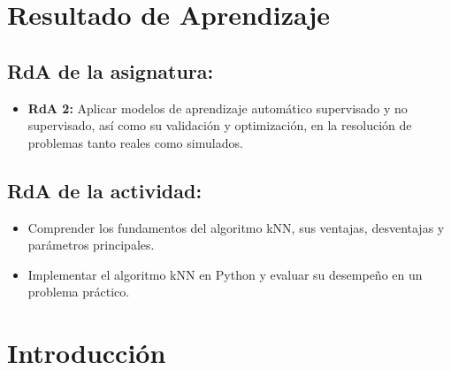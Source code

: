 \documentclass[a4,11pt]{aleph-notas}
\begin{document}
\encabezado


\section*{Resultado de Aprendizaje}

\subsection*{RdA de la asignatura:}
\begin{itemize}[leftmargin=*]
    \item \textbf{RdA 2:} 
    Aplicar modelos de aprendizaje automático supervisado y no supervisado, así como su validación y optimización, en la resolución de problemas tanto reales como simulados.
\end{itemize}

\subsection*{RdA de la actividad:}
\begin{itemize}[leftmargin=*]
    \item Comprender los fundamentos del algoritmo kNN, sus ventajas, desventajas y parámetros principales.
    \item Implementar el algoritmo kNN en Python y evaluar su desempeño en un problema práctico.
\end{itemize}

\section*{Introducción}

\end{document}
